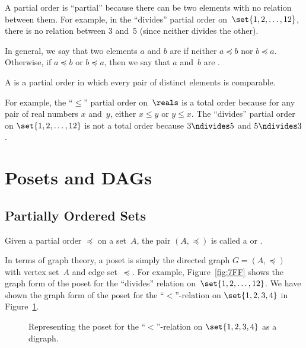 A partial order is ``partial'' because there can be two elements with
no relation between them.  For example, in the ``divides'' partial
order on~$\set{1, 2, \dots, 12}$, there is no relation between 3 and~5
(since neither divides the other).

In general, we say that two elements $a$ and $b$ are
 if neither $a \preceq b$ nor $b \preceq a$.
Otherwise, if $a \preceq b$ or $b \preceq a$, then we say that $a$
and~$b$ are .

\begin{definition}\label{def:total_order}
A  is a partial order in which every pair of
distinct elements is comparable.
\end{definition}

For example, the ``$\le$'' partial order on~$\reals$ is a total order
because for any pair of real numbers $x$ and~$y$, either $x \le y$ or
$y \le x$.  The ``divides'' partial order on $\set{1, 2, \dots, 12}$
is not a total order because $3 \ndivides 5$ and $5 \ndivides 3$.

\section{Posets and DAGs}

\subsection{Partially Ordered Sets}

\begin{definition}\label{def:poset}
Given a partial order $\preceq$ on a set~$A$, the pair $(A, \preceq)$
is called a  or .
\end{definition}

In terms of graph theory, a poset is simply the directed graph $G =
(A, \preceq)$ with vertex set~$A$ and edge set~$\preceq$.  For example,
Figure~\ref{fig:7FF} shows the graph form of the poset for the
``divides'' relation on~$\set{1, 2, \dots, 12}$.  We have shown the
graph form of the poset for the ``$<$''-relation on $\set{1, 2, 3, 4}$
in Figure~\ref{fig:7FH}.

\begin{figure}


\caption{Representing the poset for the ``$<$''-relation on $\set{1,
    2, 3, 4}$ as a digraph.}

\label{fig:7FH}

\end{figure}

